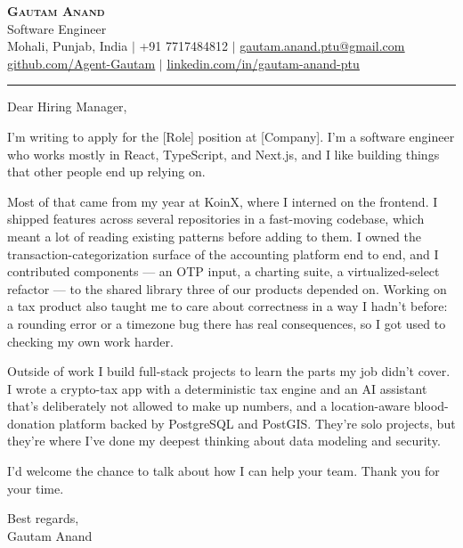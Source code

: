 \documentclass[letterpaper,11pt]{article}
\begin{document}
\begin{center}
    \textbf{\Huge \scshape Gautam Anand} \\ \vspace{2pt}
    \small Software Engineer \\ \vspace{2pt}
    \small Mohali, Punjab, India $|$ +91 7717484812 $|$
    \href{mailto:gautam.anand.ptu@gmail.com}{\underline{gautam.anand.ptu@gmail.com}} \\ \vspace{1pt}
    \small \href{https://github.com/Agent-Gautam}{\underline{github.com/Agent-Gautam}} $|$
    \href{https://www.linkedin.com/in/gautam-anand-ptu}{\underline{linkedin.com/in/gautam-anand-ptu}}
\end{center}

\vspace{6pt}
\hrule
\vspace{10pt}

Dear Hiring Manager,

I'm writing to apply for the [Role] position at [Company]. I'm a software engineer who works mostly in React, TypeScript, and Next.js, and I like building things that other people end up relying on.

Most of that came from my year at KoinX, where I interned on the frontend. I shipped features across several repositories in a fast-moving codebase, which meant a lot of reading existing patterns before adding to them. I owned the transaction-categorization surface of the accounting platform end to end, and I contributed components --- an OTP input, a charting suite, a virtualized-select refactor --- to the shared library three of our products depended on. Working on a tax product also taught me to care about correctness in a way I hadn't before: a rounding error or a timezone bug there has real consequences, so I got used to checking my own work harder.

Outside of work I build full-stack projects to learn the parts my job didn't cover. I wrote a crypto-tax app with a deterministic tax engine and an AI assistant that's deliberately not allowed to make up numbers, and a location-aware blood-donation platform backed by PostgreSQL and PostGIS. They're solo projects, but they're where I've done my deepest thinking about data modeling and security.

I'd welcome the chance to talk about how I can help your team. Thank you for your time.

\vspace{6pt}

Best regards, \\
Gautam Anand
\end{document}
